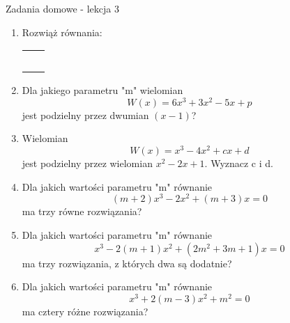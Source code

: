 \documentclass[12pt,a4paper]{article}
\begin{document}
	\newpage
	
	\begin{center}
		\LARGE Zadania domowe - lekcja 3
	\end{center}
	\vspace{1.5cm}
	
	\begin{enumerate}[1.]
		
		\item Rozwiąż równania:
		\begin{enumerate}[a)] \begin{tabular}{p{7cm} p{7cm}} 
				\item $5x^5+4x^4-5x-4=0$ & \vspace{0.4cm} 	\item$x^6-64=0$ \\
				\item $x^3+12x^2+44x+48=0$ & \item $x^8-15x^2-16=0$ \\
				\item $(x^2+x)^4-1=0$& \item $x^4-2x^2-2x-2=0$ \\
				\item $x^4+x^3-14x^2+26x-20=0$& \item $3x^3-7x^2-7x+3=0$ \\
				\item $(x-1)^3+(2x+3)^3=27x^3+8$& \item $x^4-x^3-x^2-x-2=0$ \\
		\end{tabular} \end{enumerate}
		
		\item Dla jakiego parametru "m" wielomian
		$$W(x)=6x^3+3x^2-5x+p$$
		jest podzielny przez dwumian $(x-1)$?
		
		\item Wielomian 
		$$W(x)=x^3-4x^2+cx+d$$
		jest podzielny przez wielomian $x^2-2x+1$. Wyznacz c i d.
		
		\item Dla jakich wartości parametru "m" równanie
		$$(m+2)x^3-2x^2+(m+3)x=0$$
		ma trzy równe rozwiązania?
		
		\item Dla jakich wartości parametru "m" równanie
		$$x^3-2(m+1)x^2+(2m^2+3m+1)x=0$$
		ma trzy rozwiązania, z których dwa są dodatnie?
		
		\item Dla jakich wartości parametru "m" równanie
		$$x^3+2(m-3)x^2+m^2=0$$
		ma cztery różne rozwiązania?
		
	\end{enumerate}
	
	
	
\end{document}
